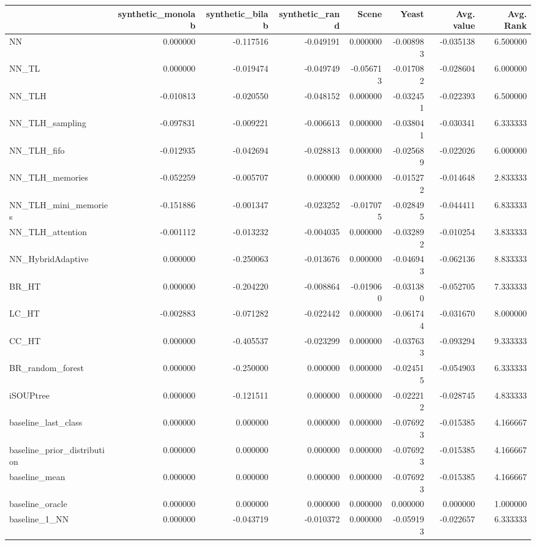 \begin{tabular}{lrrrrrrr}
\toprule
 & synthetic_monolab & synthetic_bilab & synthetic_rand & Scene & Yeast & Avg. value & Avg. Rank \\
\midrule
NN & 0.000000 & -0.117516 & -0.049191 & 0.000000 & -0.008983 & -0.035138 & 6.500000 \\
NN_TL & 0.000000 & -0.019474 & -0.049749 & -0.056713 & -0.017082 & -0.028604 & 6.000000 \\
NN_TLH & -0.010813 & -0.020550 & -0.048152 & 0.000000 & -0.032451 & -0.022393 & 6.500000 \\
NN_TLH_sampling & -0.097831 & -0.009221 & -0.006613 & 0.000000 & -0.038041 & -0.030341 & 6.333333 \\
NN_TLH_fifo & -0.012935 & -0.042694 & -0.028813 & 0.000000 & -0.025689 & -0.022026 & 6.000000 \\
NN_TLH_memories & -0.052259 & -0.005707 & 0.000000 & 0.000000 & -0.015272 & -0.014648 & 2.833333 \\
NN_TLH_mini_memories & -0.151886 & -0.001347 & -0.023252 & -0.017075 & -0.028495 & -0.044411 & 6.833333 \\
NN_TLH_attention & -0.001112 & -0.013232 & -0.004035 & 0.000000 & -0.032892 & -0.010254 & 3.833333 \\
NN_HybridAdaptive & 0.000000 & -0.250063 & -0.013676 & 0.000000 & -0.046943 & -0.062136 & 8.833333 \\
BR_HT & 0.000000 & -0.204220 & -0.008864 & -0.019060 & -0.031380 & -0.052705 & 7.333333 \\
LC_HT & -0.002883 & -0.071282 & -0.022442 & 0.000000 & -0.061744 & -0.031670 & 8.000000 \\
CC_HT & 0.000000 & -0.405537 & -0.023299 & 0.000000 & -0.037633 & -0.093294 & 9.333333 \\
BR_random_forest & 0.000000 & -0.250000 & 0.000000 & 0.000000 & -0.024515 & -0.054903 & 6.333333 \\
iSOUPtree & 0.000000 & -0.121511 & 0.000000 & 0.000000 & -0.022212 & -0.028745 & 4.833333 \\
baseline_last_class & 0.000000 & 0.000000 & 0.000000 & 0.000000 & -0.076923 & -0.015385 & 4.166667 \\
baseline_prior_distribution & 0.000000 & 0.000000 & 0.000000 & 0.000000 & -0.076923 & -0.015385 & 4.166667 \\
baseline_mean & 0.000000 & 0.000000 & 0.000000 & 0.000000 & -0.076923 & -0.015385 & 4.166667 \\
baseline_oracle & 0.000000 & 0.000000 & 0.000000 & 0.000000 & 0.000000 & 0.000000 & 1.000000 \\
baseline_1_NN & 0.000000 & -0.043719 & -0.010372 & 0.000000 & -0.059193 & -0.022657 & 6.333333 \\
\bottomrule
\end{tabular}
